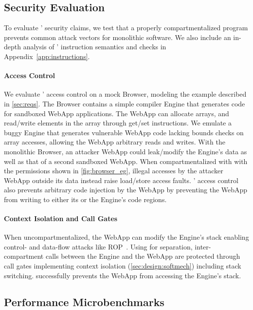 \subsection{Security Evaluation}

To evaluate \seccells' security claims, we test that a properly 
compartmentalized \seccells program prevents common attack vectors
for monolithic software.
We also include an in-depth analysis of \seccells' instruction semantics and
checks in Appendix~\ref{app:instructions}.

\paragraph{Access Control}
We evaluate \seccells' access control on a mock Browser,
modeling the example described in \autoref{sec:reqs}.
The Browser contains a simple compiler Engine that generates code for
sandboxed WebApp applications.
The WebApp can allocate arrays, and read/write elements in the array through
get/set instructions.
We emulate a buggy Engine that generates vulnerable WebApp code lacking bounds 
checks on array accesses, allowing the WebApp arbitrary reads and writes.
With the monolithic Browser, an attacker WebApp could leak/modify the
Engine's data as well as that of a second sandboxed WebApp.
When compartmentalized with \seccells with the permissions shown in 
\autoref{fig:browser_eg}, illegal accesses by the attacker WebApp outside its
data \cell instead raise load/store access faults.
\seccells' access control also prevents arbitrary code injection by the WebApp
by preventing the WebApp from writing to either its or the Engine's code regions.

\paragraph{Context Isolation and Call Gates}
When uncompartmentalized, the WebApp can modify the Engine's stack enabling
control- and data-flow attacks like ROP~\cite{Shacham07}.
Using \seccells for separation, inter-compartment calls between the 
Engine and the WebApp are protected through call gates 
implementing context isolation (\autoref{sec:design:softmech}) including
stack switching.
\seccells successfully prevents the WebApp from accessing the Engine's stack.

\subsection{Performance Microbenchmarks}


